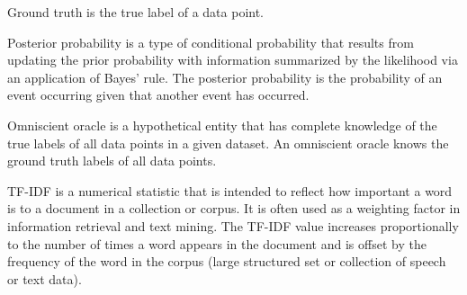 \begin{defn}
\label{def:ground_truth}
Ground truth is the true label of a data point.
\end{defn}

\begin{defn}
\label{def:posterior_probabilities}
Posterior probability is a type of conditional probability that results from updating the prior probability with information summarized by the likelihood via an application of Bayes' rule. The posterior probability is the probability of an event occurring given that another event has occurred.
\end{defn}

\begin{defn}
\label{def:omniscient_oracles}
Omniscient oracle is a hypothetical entity that has complete knowledge of the true labels of all data points in a given dataset. An omniscient oracle knows the ground truth labels of all data points.
\end{defn}

\begin{defn}[TF-IDF]
\label{def:tf_idf}
TF-IDF is a numerical statistic that is intended to reflect how important a word is to a document in a collection or corpus. It is often used as a weighting factor in information retrieval and text mining. The TF-IDF value increases proportionally to the number of times a word appears in the document and is offset by the frequency of the word in the corpus (large structured set or collection of speech or text data).
\end{defn}